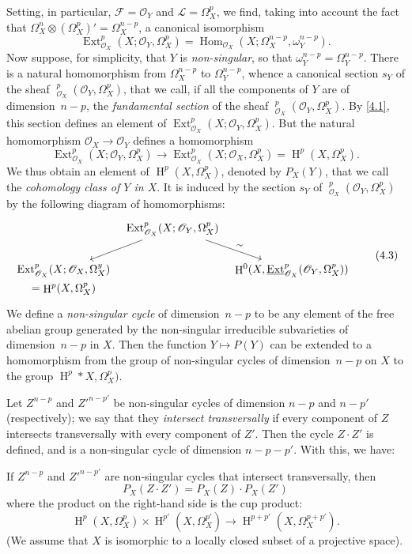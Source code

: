 \documentclass{article}
\theoremstyle{plain}
\newenvironment{theorem}[1]
  {\renewcommand\theinnercustomtheorem{#1}\innercustomtheorem}
  {\endinnercustomtheorem}
\theoremstyle{definition}
\newcommand{\sh}{\mathscr}
\DeclareMathOperator{\Ext}{Ext}
\DeclareMathOperator{\Hom}{Hom}
\DeclareMathOperator{\shExt}{\underline{Ext}}
\DeclareMathOperator{\HH}{H}
\newcommand{\oldpage}[1]{\marginpar{\footnotesize$\Big\vert$ \textit{p.~#1}}}
\begin{document}
Setting, in particular, $\sh{F}=\sh{O}_Y$ and $\sh{L}=\Omega_X^p$, we find, taking into account the fact that $\Omega_X^n\otimes(\Omega_X^p)'=\Omega_X^{n-p}$, a canonical isomorphism
\[
\label{4.2}
  \Ext_{\sh{O}_X}^p(X;\sh{O}_Y,\Omega_X^p) = \Hom_{\sh{O}_X}(X;\Omega_X^{n-p},\omega_Y^{n-p}).
\tag{4.2}
\]
Now suppose, for simplicity, that $Y$ is \emph{non-singular}, so that $\omega_Y^{n-p}=\Omega_Y^{n-p}$.
There is a natural homomorphism from $\Omega_X^{n-p}$ to $\Omega_Y^{n-p}$, whence a canonical section $s_Y$ of the sheaf $\shExt_{\sh{O}_X}^p(\sh{O}_Y,\Omega_X^p)$, that we call, if all the components of $Y$ are of dimension~$n-p$, the \emph{fundamental section} of the sheaf $\shExt_{\sh{O}_X}^p(\sh{O}_Y,\Omega_X^p)$.
By \cref{4.1}, this section defines an element of $\Ext_{\sh{O}_X}^p(X;\sh{O}_Y,\Omega_X^p)$.
But the natural homomorphism $\sh{O}_X\to\sh{O}_Y$ defines a homomorphism
\[
  \Ext_{\sh{O}_X}^p(X;\sh{O}_Y,\Omega_X^p) \to \Ext_{\sh{O}_X}^p(X;\sh{O}_X,\Omega_X^p) = \HH^p(X,\Omega_X^p).
\]
We thus obtain an element of $\HH^p(X,\Omega_X^p)$, denoted by $P_X(Y)$, that we call the \emph{cohomology class of $Y$ in $X$}.
It is induced by the section $s_Y$ of $\shExt_{\sh{O}_X}^p(\sh{O}_Y,\Omega_X^p)$ by the following diagram of homomorphisms:
\[
\label{4.3}
  \begin{tikzcd}[column sep=tiny]
    & \Ext_{\sh{O}_X}^p(X;\sh{O}_Y,\Omega_X^p) \ar[dl] \ar[dr,"\sim"]
  \\\Ext_{\sh{O}_X}^p(X;\sh{O}_X,\Omega_X^y) && \HH^0(X,\shExt_{\sh{O}_X}^p(\sh{O}_Y,\Omega_X^p))
  \\[-2em]=\HH^p(X,\Omega_X^p)
  \end{tikzcd}
\tag{4.3}
\]
We define a \emph{non-singular cycle} of dimension~$n-p$ to be any element of the free abelian group generated by the non-singular irreducible subvarieties of dimension~$n-p$ in $X$.
Then the function $Y\mapsto P(Y)$ can be extended to a homomorphism from the group of non-singular cycles of dimension~$n-p$ on $X$ to the group $\HH^p*X,\Omega_X^p)$.

Let $Z^{n-p}$ and $Z'^{n-p'}$ be non-singular cycles of dimension $n-p$ and $n-p'$ (respectively);
we say that they \emph{intersect transversally} if every component of $Z$ intersects transversally with every component of $Z'$.
Then the cycle $Z\cdot Z'$ is defined, and is a non-singular cycle of dimension $n-p-p'$.
With this, we have:

\oldpage{149-11}
\begin{theorem}{1}
\label{theorem1}
  If $Z^{n-p}$ and $Z'^{n-p'}$ are non-singular cycles that intersect transversally, then
  \[
  \label{4.4}
    P_X(Z\cdot Z') = P_X(Z)\cdot P_X(Z')
  \tag{4.4}
  \]
  where the product on the right-hand side is the cup product:
  \[
    \HH^p(X,\Omega_X^p)\times\HH^{p'}(X,\Omega_X^{p'}) \to \HH^{p+p'}(X,\Omega_X^{p+p'}).
  \]
  (We assume that $X$ is isomorphic to a locally closed subset of a projective space).
\end{theorem}
\end{document}
